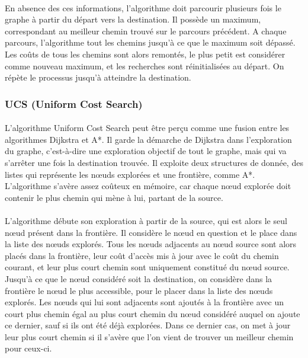 \documentclass[pidr]{tnreport}
\begin{document}
\paragraph{}
En absence des ces informations, l'algorithme doit parcourir plusieurs fois le graphe à partir du départ vers la destination. Il possède un maximum, correspondant au meilleur chemin trouvé sur le parcours précédent. A chaque parcours, l'algorithme tout les chemins jusqu'à ce que le maximum soit dépassé. Les coûts de tous les chemins sont alors remontés, le plus petit est considérer comme nouveau maximum, et les recherches sont réinitialisées au départ. On répète le processus jusqu'à atteindre la destination.   

			\subsubsection{UCS (Uniform Cost Search)}
\paragraph{}			
L'algorithme Uniform Cost Search peut être perçu comme une fusion entre les algorithmes Dijkstra et A*. Il garde la démarche de Dijkstra dans l'exploration du graphe, c'est-à-dire une exploration objectif de tout le graphe, mais qui va s'arrêter une fois la destination trouvée. Il exploite deux structures de donnée, des listes qui représente les nœuds explorées et une frontière, comme A*. L'algorithme s'avère assez coûteux en mémoire, car chaque nœud explorée doit contenir le plus chemin qui mène à lui, partant de la source.  

\paragraph{}		
L'algorithme débute son exploration à partir de la source, qui est alors le seul nœud présent dans la frontière. Il considère le nœud en question et le place dans la liste des nœuds explorés. Tous les nœuds adjacents au nœud source sont alors placés dans la frontière, leur coût d'accès mis à jour avec le coût du chemin courant, et leur plus court chemin sont uniquement constitué du nœud source. Jusqu'à ce que le nœud considéré soit la destination, on considère dans la frontière le nœud le plus accessible, pour le placer dans la liste des nœuds explorés. Les nœuds qui lui sont adjacents sont ajoutés à la frontière avec un court plus chemin égal au plus court chemin du nœud considéré auquel on ajoute ce dernier, sauf si ils ont été déjà explorées. Dans ce dernier cas, on met à jour leur plus court chemin si il s'avère que l'on vient de trouver un meilleur chemin pour ceux-ci.   
\end{document}
